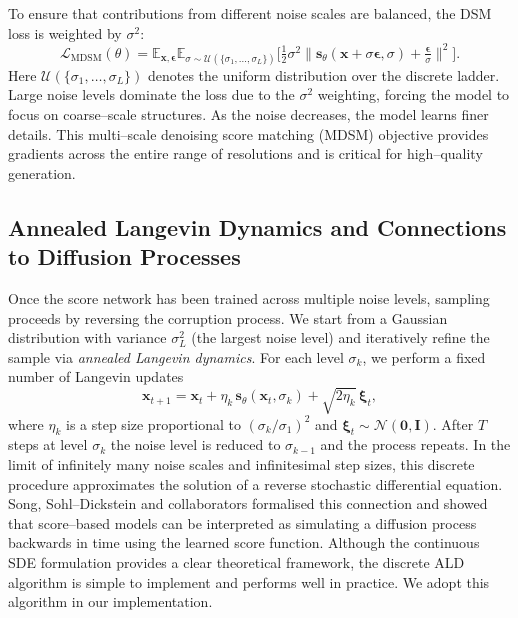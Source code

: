 To ensure that contributions from different noise scales are balanced,
the DSM loss is weighted by $\sigma^2$:
\begin{equation}
    \mathcal{L}_{\text{MDSM}}(\theta) =
    \mathbb{E}_{\mathbf{x},\boldsymbol{\epsilon}}
    \mathbb{E}_{\sigma \sim \mathcal{U}(\{\sigma_1,\dots,\sigma_L\})}
    \Big[ \tfrac{1}{2} \sigma^2 \big\|\mathbf{s}_\theta(\mathbf{x} +
    \sigma \boldsymbol{\epsilon}, \sigma) + \tfrac{\boldsymbol{\epsilon}}{\sigma}
    \big\|^2 \Big].
    \label{eq:mdsm-loss}
\end{equation}
Here $\mathcal{U}(\{\sigma_1,\dots,\sigma_L\})$ denotes the uniform
distribution over the discrete ladder.  Large noise levels dominate the
loss due to the $\sigma^2$ weighting, forcing the model to focus on
coarse–scale structures.  As the noise decreases, the model learns finer
details.  This multi–scale denoising score matching (MDSM) objective
provides gradients across the entire range of resolutions and is critical
for high–quality generation.
\subsection{Annealed Langevin Dynamics and Connections to Diffusion Processes}

Once the score network has been trained across multiple noise levels,
sampling proceeds by reversing the corruption process.  We start from a
Gaussian distribution with variance $\sigma_L^2$ (the largest noise
level) and iteratively refine the sample via \emph{annealed Langevin
dynamics}.  For each level $\sigma_k$, we perform a fixed number of
Langevin updates
\begin{equation}
    \mathbf{x}_{t+1} = \mathbf{x}_t + \eta_k\,\mathbf{s}_\theta(\mathbf{x}_t,
    \sigma_k) + \sqrt{2\eta_k}\,\boldsymbol{\xi}_t,
\end{equation}
where $\eta_k$ is a step size proportional to $(\sigma_k/\sigma_1)^2$ and
$\boldsymbol{\xi}_t \sim \mathcal{N}(\mathbf{0},\mathbf{I})$.  After $T$
steps at level $\sigma_k$ the noise level is reduced to $\sigma_{k-1}$
and the process repeats.  In the limit of infinitely many noise scales
and infinitesimal step sizes, this discrete procedure approximates the
solution of a reverse stochastic differential equation.  Song,
Sohl–Dickstein and collaborators formalised this connection and showed
that score–based models can be interpreted as simulating a diffusion
process backwards in time using the learned score function.  Although the
continuous SDE formulation provides a clear theoretical framework, the
discrete ALD algorithm is simple to implement and performs well in
practice.  We adopt this algorithm in our implementation.

